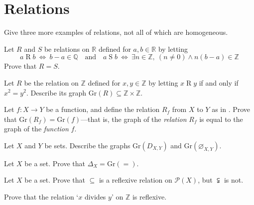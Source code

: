 \section{Relations}


\begin{exercise}
Give three more examples of relations, not all of which are homogeneous.
\end{exercise}


\begin{exercise}
Let $R$ and $S$ be relations on $\mathbb{R}$ defined for $a,b \in \mathbb{R}$ by letting
\[ a \mathrel{R} b ~ \Leftrightarrow ~ b-a \in \mathbb{Q} \quad \text{and} \quad a \mathrel{S} b ~ \Leftrightarrow ~ \exists n \in \mathbb{Z},~ (n \ne 0) \wedge n(b-a) \in \mathbb{Z} \]
Prove that $R=S$.
\end{exercise}


\begin{exercise}
Let $R$ be the relation on $\mathbb{Z}$ defined for $x,y \in \mathbb{Z}$ by letting $x \mathrel{R} y$ if and only if $x^2=y^2$. Describe its graph $\mathrm{Gr}(R) \subseteq \mathbb{Z} \times \mathbb{Z}$.
\end{exercise}

\begin{exercise}
Let $f : X \to Y$ be a function, and define the relation $R_f$ from $X$ to $Y$ as in . Prove that $\mathrm{Gr}(R_f) = \mathrm{Gr}(f)$---that is, the graph of the \textit{relation} $R_f$ is equal to the graph of the \textit{function} $f$.
\end{exercise}


\begin{exercise}
\label{exGraphOfEmptyAndDiscreteRelations}
Let $X$ and $Y$ be sets. Describe the graphs $\mathrm{Gr}(D_{X,Y})$ and $\mathrm{Gr}(\varnothing_{X,Y})$.
\end{exercise}

\begin{exercise}
Let $X$ be a set. Prove that $\Delta_X = \mathrm{Gr}(=)$.
\end{exercise}


\begin{exercise}
\label{exSubsetIsReflexive}
Let $X$ be a set. Prove that $\subseteq$ is a reflexive relation on $\mathcal{P}(X)$, but $\subsetneqq$ is not.
\end{exercise}

\begin{exercise}
\label{exDivisibilityIsReflexive}
Prove that the relation `$x$ divides $y$' on $\mathbb{Z}$ is reflexive.
\end{exercise}



